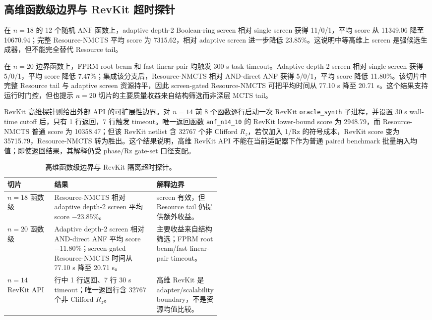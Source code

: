 \documentclass[UTF8,fontset=macnew,11pt]{ctexart}
\newcommand{\method}{Resource-NMCTS}
\newcommand{\screen}{Boolean-ring screen}
\newcommand{\anf}{\ensuremath{\mathrm{ANF}}}
\newcommand{\mcts}{\ensuremath{\mathrm{MCTS}}}
\begin{document}
\subsection{高维函数级边界与 RevKit 超时探针}

在 $n=18$ 的 12 个随机 \anf{} 函数上，adaptive depth-2 \screen{} 相对 single screen 获得 11/0/1，平均 score 从 11349.06 降至 10670.94；完整 \method{} 平均 score 为 7315.62，相对 adaptive screen 进一步降低 23.85\%。这说明中等高维上 screen 是强候选生成器，但不能完全替代 Resource tail。

在 $n=20$ 边界函数上，FPRM root beam 和 fast linear-pair 均触发 300 s task timeout。Adaptive depth-2 screen 相对 single screen 获得 5/0/1，平均 score 降低 7.47\%；集成该分支后，\method{} 相对 AND-direct ANF 获得 5/0/1，平均 score 降低 11.80\%。该切片中完整 Resource tail 与 adaptive screen 资源持平，因此 screen-gated \method{} 可把平均时间从 77.10 s 降至 20.71 s。这个结果支持运行时门控，但也提示 $n=20$ 切片的主要质量收益来自结构筛选而非深层 \mcts{} tail。

RevKit 高维探针则给出外部 API 的可扩展性边界。对 $n=14$ 前 8 个函数逐行启动一次 RevKit \texttt{oracle\_synth} 子进程，并设置 30 s wall-time cutoff 后，只有 1 行返回，7 行触发 timeout。唯一返回函数 \texttt{anf\_n14\_10} 的 RevKit lower-bound score 为 2948.79，而 \method{} 普通 score 为 10358.47；但该 RevKit netlist 含 32767 个非 Clifford $R_z$，若仅加入 1/Rz 的符号成本，RevKit score 变为 35715.79，\method{} 转为胜出。这个结果说明，高维 RevKit API 不能在当前适配器下作为普通 paired benchmark 批量纳入均值；即使返回结果，其解释仍受 phase/Rz gate-set 口径支配。

\begin{table}[H]
\centering
\scriptsize
\caption{高维函数级边界与 RevKit 隔离超时探针。}
\label{tab:highdim-v27}
\begin{tabularx}{\linewidth}{>{\raggedright\arraybackslash}p{0.22\linewidth}>{\raggedright\arraybackslash}X>{\raggedright\arraybackslash}p{0.28\linewidth}}
\toprule
切片 & 结果 & 解释边界 \\
\midrule
$n=18$ 函数级 & \method{} 相对 adaptive depth-2 screen 平均 score $-23.85\%$。 & screen 有效，但 Resource tail 仍提供额外收益。 \\
$n=20$ 函数级 & Adaptive depth-2 screen 相对 AND-direct ANF 平均 score $-11.80\%$；screen-gated \method{} 时间从 77.10 s 降至 20.71 s。 & 主要收益来自结构筛选；FPRM root beam/fast linear-pair timeout。 \\
$n=14$ RevKit API & 8 行中 1 行返回、7 行 30 s timeout；唯一返回行含 32767 个非 Clifford $R_z$。 & 高维 RevKit 是 adapter/scalability boundary，不是资源均值比较。 \\
\bottomrule
\end{tabularx}
\end{table}
\end{document}
